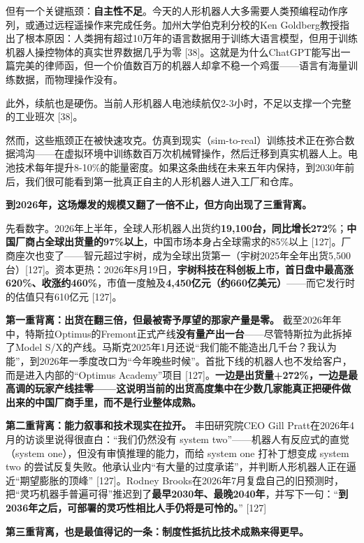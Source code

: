 \documentclass[11pt,a4paper]{ctexart}
\begin{document}
但有一个关键瓶颈：\textbf{自主性不足}。今天的人形机器人大多需要人类预编程动作序列，或通过远程遥操作来完成任务。加州大学伯克利分校的Ken Goldberg教授指出了根本原因：人类拥有超过10万年的语言数据用于训练大语言模型，但用于训练机器人操控物体的真实世界数据几乎为零 [38]。这就是为什么ChatGPT能写出一篇完美的律师函，但一个价值数百万的机器人却拿不稳一个鸡蛋——语言有海量训练数据，而物理操作没有。

此外，续航也是硬伤。当前人形机器人电池续航仅2-3小时，不足以支撑一个完整的工业班次 [38]。

然而，这些瓶颈正在被快速攻克。仿真到现实（sim-to-real）训练技术正在弥合数据鸿沟——在虚拟环境中训练数百万次机械臂操作，然后迁移到真实机器人上。电池技术每年提升8-10\%的能量密度。如果这条曲线在未来五年内保持，到2030年前后，我们很可能看到第一批真正自主的人形机器人进入工厂和仓库。

\textbf{到2026年，这场爆发的规模又翻了一倍不止，但方向出现了三重背离。}

先看数字。2026年上半年，全球人形机器人出货约\textbf{19,100台，同比增长272\%}；\textbf{中国厂商占全球出货量的97\%以上}，中国市场本身占全球需求的85\%以上 [127]。厂商座次也变了——智元超过宇树，成为全球出货第一（宇树2025年全年出货5,500台）[127]。资本更热：2026年8月19日，\textbf{宇树科技在科创板上市，首日盘中最高涨620\%、收涨约460\%}，市值一度触及\textbf{4,450亿元（约660亿美元）}——而它发行时的估值只有610亿元 [127]。

\textbf{第一重背离：出货在翻三倍，但最被寄予厚望的那家产量是零。} 截至2026年年中，特斯拉Optimus的Fremont正式产线\textbf{没有量产出一台}——尽管特斯拉为此拆掉了Model S/X的产线。马斯克2025年1月还说“我们能不能造出几千台？我认为能”，到2026年一季度改口为“今年晚些时候”。首批下线的机器人也不发给客户，而是进入内部的“Optimus Academy”项目 [127]。\textbf{一边是出货量+272\%，一边是最高调的玩家产线挂零——这说明当前的出货高度集中在少数几家能真正把硬件做出来的中国厂商手里，而不是行业整体成熟。}

\textbf{第二重背离：能力叙事和技术现实在拉开。} 丰田研究院CEO Gill Pratt在2026年4月的访谈里说得很直白：“我们仍然没有 system two”——机器人有反应式的直觉（system one），但没有审慎推理的能力，而给 system one 打补丁想变成 system two 的尝试反复失败。他承认业内“有大量的过度承诺”，并判断人形机器人正在逼近“期望膨胀的顶峰” [127]。Rodney Brooks在2026年7月复盘自己的旧预测时，把“灵巧机器手普遍可得”推迟到了\textbf{最早2030年、最晚2040年}，并写下一句：“\textbf{到2036年之后，可部署的灵巧性相比人手仍将是可怜的。}” [127]

\textbf{第三重背离，也是最值得记的一条：制度性抵抗比技术成熟来得更早。}
\end{document}
